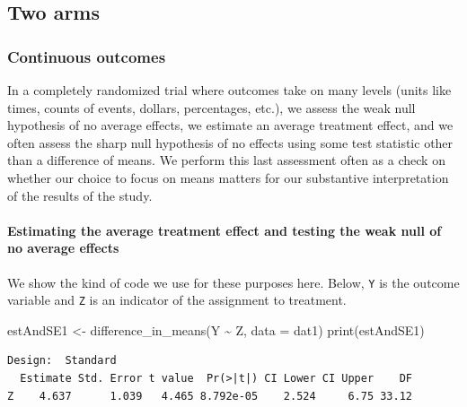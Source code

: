 \documentclass[
  12pt,
]{book}
\newenvironment{Shaded}{\begin{snugshade}}{\end{snugshade}}
\newcommand{\AttributeTok}[1]{\textcolor[rgb]{0.77,0.63,0.00}{#1}}
\newcommand{\FunctionTok}[1]{\textcolor[rgb]{0.00,0.00,0.00}{#1}}
\newcommand{\NormalTok}[1]{#1}
\newcommand{\OtherTok}[1]{\textcolor[rgb]{0.56,0.35,0.01}{#1}}
\newcommand{\SpecialCharTok}[1]{\textcolor[rgb]{0.00,0.00,0.00}{#1}}
\theoremstyle{definition}
\theoremstyle{definition}
\theoremstyle{definition}
\theoremstyle{remark}
\begin{document}
\hypertarget{two-arms}{%
\subsection{Two arms}\label{two-arms}}

\hypertarget{continuous-outcomes}{%
\subsubsection{Continuous outcomes}\label{continuous-outcomes}}

In a completely randomized trial where outcomes take on many levels
(units like times, counts of events, dollars, percentages, etc.), we
assess the weak null hypothesis of no average effects, we estimate an
average treatment effect, and we often assess the sharp null hypothesis
of no effects using some test statistic other than a difference of
means. We perform this last assessment often as a check on whether our
choice to focus on means matters for our substantive interpretation of
the results of the study.

\hypertarget{estimating-the-average-treatment-effect-and-testing-the-weak-null-of-no-average-effects}{%
\paragraph{Estimating the average treatment effect and testing the weak
null of no average
effects}\label{estimating-the-average-treatment-effect-and-testing-the-weak-null-of-no-average-effects}}

We show the kind of code we use for these purposes here. Below,
\texttt{Y} is the outcome variable and \texttt{Z} is an indicator of the
assignment to treatment.

\begin{Shaded}
\begin{Highlighting}[]
\NormalTok{estAndSE1 }\OtherTok{\textless{}{-}} \FunctionTok{difference\_in\_means}\NormalTok{(Y }\SpecialCharTok{\textasciitilde{}}\NormalTok{ Z, }\AttributeTok{data =}\NormalTok{ dat1)}
\FunctionTok{print}\NormalTok{(estAndSE1)}
\end{Highlighting}
\end{Shaded}

\begin{verbatim}
Design:  Standard 
  Estimate Std. Error t value  Pr(>|t|) CI Lower CI Upper    DF
Z    4.637      1.039   4.465 8.792e-05    2.524     6.75 33.12
\end{verbatim}
\end{document}
